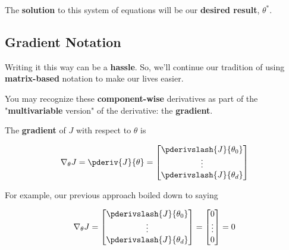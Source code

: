         
        The \textbf{solution} to this system of equations will be our \textbf{desired result}, $\theta^*$.
        
    \subsection{Gradient Notation}
    
        Writing it this way can be a \textbf{hassle}. So, we'll continue our tradition of using \textbf{matrix-based} notation to make our lives easier.
        
        You may recognize these \textbf{component-wise} derivatives as part of the "\textbf{multivariable} version" of the derivative: the \textbf{gradient}.\\
        
        \begin{kequation}
            The \textbf{gradient} of $J$ with respect to $\theta$ is
            
            \begin{equation}
                \nabla_\theta J =
                \pderiv{J}{\theta} =
                \begin{bmatrix}
                    \pderivslash{J}{\theta_0} \\
                    \vdots \\
                    \pderivslash{J}{\theta_d}
                \end{bmatrix}
            \end{equation}
        
        \end{kequation}
        
        
        For example, our previous approach boiled down to saying
        
        \begin{equation}
            \nabla_\theta J =
            \begin{bmatrix}
                \pderivslash{J}{\theta_0} \\
                \vdots \\
                \pderivslash{J}{\theta_d}
            \end{bmatrix}
            = 
            \begin{bmatrix}
                0 \\
                \vdots \\
                0
            \end{bmatrix}
            =
            0
        \end{equation}
        
